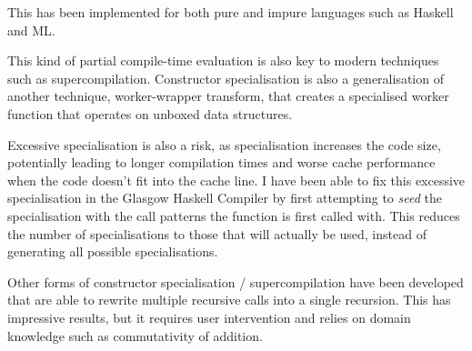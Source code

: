 This has been implemented for both pure and impure languages such as Haskell and ML\cite{thiemann1993avoiding, mogensen1993constructor}.

This kind of partial compile-time evaluation is also key to modern techniques such as supercompilation\cite{bolingbroke2011supercomp}.
Constructor specialisation is also a generalisation of another technique, worker-wrapper transform\cite{gill2009worker},
that creates a specialised worker function that operates on unboxed data structures.

Excessive specialisation is also a risk, as specialisation increases the code size, potentially leading to longer compilation times and worse cache performance when the code doesn't fit into the cache line.
I have been able to fix this excessive specialisation in the Glasgow Haskell Compiler by first attempting to \emph{seed} the specialisation with the call patterns the function is first called with.
This reduces the number of specialisations to those that will actually be used, instead of generating all possible specialisations.

Other forms of constructor specialisation / supercompilation have been developed that are able to rewrite multiple recursive calls into a single recursion\cite{burstall1977transformation}.
This has impressive results, but it requires user intervention and relies on domain knowledge such as commutativity of addition.


